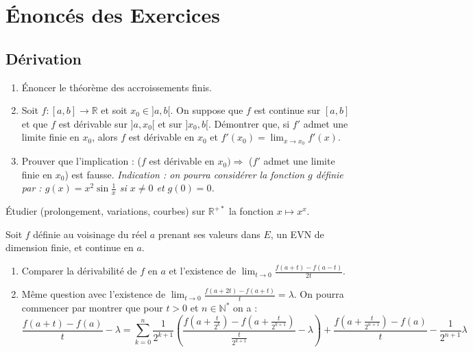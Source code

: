 \section{Énoncés des Exercices}

\subsection{Dérivation}

\begin{exercice}
\begin{enumerate}
    \item Énoncer le théorème des accroissements finis.
    \item Soit $f:[a,b]\longrightarrow\mathbb{R}$ et soit $x_{0}\in]a,b[$. On suppose que $f$ est continue sur $[a, b]$ et que $f$ est dérivable sur $]a, x_{0}[$ et sur $]x_{0}, b[$.
    Démontrer que, si $f'$ admet une limite finie en $x_{0}$, alors $f$ est dérivable en $x_{0}$ et $f'(x_{0})=\lim_{x\rightarrow x_{0}}f'(x)$.
    \item Prouver que l'implication : ($f$ est dérivable en $x_{0}) \Rightarrow$ ($f'$ admet une limite finie en $x_{0}$) est fausse.
    \textit{Indication : on pourra considérer la fonction $g$ définie par : $g(x)=x^{2}\sin\frac{1}{x}$ si $x\ne0$ et $g(0)=0$.}
\end{enumerate}
\end{exercice}

\begin{exercice}
Étudier (prolongement, variations, courbes) sur $\mathbb{R}^{+*}$ la fonction $x\mapsto x^{x}$.
\end{exercice}

\begin{exercice}
Soit $f$ définie au voisinage du réel $a$ prenant ses valeurs dans $E$, un EVN de dimension finie, et continue en $a$.
\begin{enumerate}
    \item Comparer la dérivabilité de $f$ en $a$ et l'existence de $\lim_{t\rightarrow0}\frac{f(a+t)-f(a-t)}{2t}$.
    \item Même question avec l'existence de $\lim_{t\rightarrow0}\frac{f(a+2t)-f(a+t)}{t}=\lambda$.
    On pourra commencer par montrer que pour $t>0$ et $n\in\mathbb{N}^{*}$ on a :
    $$ \frac{f(a+t)-f(a)}{t} - \lambda = \sum_{k=0}^{n}\frac{1}{2^{k+1}}\left(\frac{f(a+\frac{t}{2^{k}})-f(a+\frac{t}{2^{k+1}})}{\frac{t}{2^{k+1}}} - \lambda\right) + \frac{f(a+\frac{t}{2^{n+1}})-f(a)}{t} - \frac{1}{2^{n+1}}\lambda $$
\end{enumerate}
\end{exercice}

